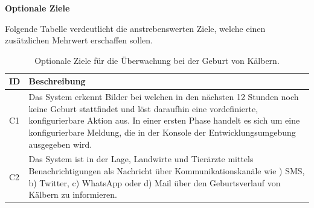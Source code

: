 \textbf{Optionale Ziele }

Folgende Tabelle verdeutlicht die anstrebenswerten Ziele, welche einen zusätzlichen Mehrwert erschaffen sollen.
\begin{table}[H]
	
	\begin{tabular}{ p{1cm} p{14cm}  }
		
		\toprule[1pt]
		\rowcolor{maroon!30}		
		
		ID & Beschreibung \\
		
		\midrule 
		C1 & Das System erkennt Bilder bei welchen in den nächsten 12 Stunden noch keine Geburt stattfindet und löst daraufhin eine vordefinierte, konfigurierbare Aktion aus. In einer ersten Phase handelt es sich um eine konfigurierbare Meldung, die in der Konsole der Entwicklungsumgebung ausgegeben wird.\\ 
		C2 & Das System ist in der Lage, Landwirte und Tierärzte mittels Benachrichtigungen als Nachricht über Kommunikationskanäle wie ) SMS, b) Twitter, c) WhatsApp oder d) Mail über den Geburtsverlauf von Kälbern zu informieren.  \\
		\bottomrule
		
	\end{tabular}
	\caption{Optionale Ziele für die Überwachung bei der Geburt von Kälbern.}
	\label{tab: Optionale Ziele für die Überwachung bei der Geburt von Kälbern.}
\end{table}
